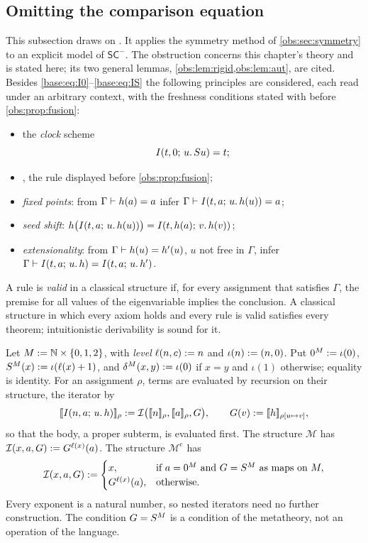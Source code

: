 \subsection{Omitting the comparison equation}
\label{disch:sec:scalar-obs}

This subsection draws on . It applies the symmetry
method of \cref{obs:sec:symmetry} to an explicit model of
$\mathsf{SC}^{-}$. The obstruction concerns this chapter's theory and is
stated here; its two general lemmas, \cref{obs:lem:rigid,obs:lem:aut}, are
cited. Besides \eqref{base:eq:I0}--\eqref{base:eq:IS} the following
principles are considered, each read under an arbitrary context, with the
freshness conditions stated with  before
\cref{obs:prop:fusion}:
\begin{itemize}
\item the \emph{clock} scheme
 \begin{equation}
  I(t,0;\,u.\,S u)=t ;
  \label{disch:eq:clock}
 \end{equation}
\item {}, the rule displayed before \cref{obs:prop:fusion};
\item \emph{fixed points}: from $\Gamma\vdash h(a)=a$ infer
 $\Gamma\vdash I(t,a;\,u.\,h(u))=a$;
\item \emph{seed shift}: $h\bigl(I(t,a;\,u.\,h(u))\bigr)=I(t,h(a);\,v.\,h(v))$;
\item \emph{extensionality}: from $\Gamma\vdash h(u)=h'(u)$, $u$ not free in
 $\Gamma$, infer $\Gamma\vdash I(t,a;\,u.\,h)=I(t,a;\,u.\,h')$.
\end{itemize}
A rule is \emph{valid} in a classical structure if, for every assignment that
satisfies $\Gamma$, the premise for all values of the eigenvariable implies
the conclusion. A classical structure in which every axiom holds and every
rule is valid satisfies every theorem; intuitionistic derivability is
sound for it.

\begin{definition}
\label{disch:def:sc-model}
Let $M\mathrel{:=}\mathbb N\times\{0,1,2\}$, with \emph{level}
$\ell(n,c)\mathrel{:=} n$ and $\iota(n)\mathrel{:=}(n,0)$. Put $0^M\mathrel{:=}\iota(0)$,
$S^M(x)\mathrel{:=}\iota(\ell(x)+1)$, and $\delta^M(x,y)\mathrel{:=}\iota(0)$ if $x=y$
and $\iota(1)$ otherwise; equality is identity. For an assignment $\rho$,
terms are evaluated by recursion on their structure, the iterator by
\[
 [\![\It{n}{a}{u}{h}]\!]_\rho\defeq
 \mathcal I\bigl([\![n]\!]_\rho,[\![a]\!]_\rho,G\bigr),\qquad
 G(v)\defeq[\![h]\!]_{\rho[u\mapsto v]},
\]
so that the body, a proper subterm, is evaluated first. The structure
$\mathcal M$ has $\mathcal I(x,a,G)\mathrel{:=} G^{\ell(x)}(a)$. The structure
$\mathcal M^{\mathrm c}$ has
\[
 \mathcal I(x,a,G)\mathrel{:=}
 \begin{cases}
  x, & \text{if } a=0^M \text{ and } G=S^M \text{ as maps on } M,\\
  G^{\ell(x)}(a), & \text{otherwise.}
 \end{cases}
\]
Every exponent is a natural number, so nested iterators need no further
construction. The condition $G=S^M$ is a condition of the metatheory, not
an operation of the language.
\end{definition}

